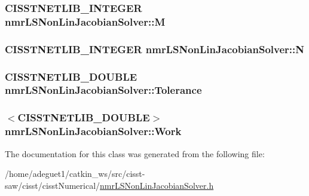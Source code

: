 \hypertarget{classnmr_l_s_non_lin_jacobian_solver_a1d5bdcef6ad8ae1f9a7819c9a0c9d2db}{
\subsubsection[{M}]{\setlength{\rightskip}{0pt plus 5cm}C\-I\-S\-S\-T\-N\-E\-T\-L\-I\-B\-\_\-\-I\-N\-T\-E\-G\-E\-R nmr\-L\-S\-Non\-Lin\-Jacobian\-Solver\-::\-M\hspace{0.3cm}{\ttfamily [protected]}}}\label{classnmr_l_s_non_lin_jacobian_solver_a1d5bdcef6ad8ae1f9a7819c9a0c9d2db}
\hypertarget{classnmr_l_s_non_lin_jacobian_solver_a50c6b56a17774e8eaaf37be19419f9b2}{
\subsubsection[{N}]{\setlength{\rightskip}{0pt plus 5cm}C\-I\-S\-S\-T\-N\-E\-T\-L\-I\-B\-\_\-\-I\-N\-T\-E\-G\-E\-R nmr\-L\-S\-Non\-Lin\-Jacobian\-Solver\-::\-N\hspace{0.3cm}{\ttfamily [protected]}}}\label{classnmr_l_s_non_lin_jacobian_solver_a50c6b56a17774e8eaaf37be19419f9b2}
\hypertarget{classnmr_l_s_non_lin_jacobian_solver_ad2dd832ff0445b614dd62570e1b3c43d}{
\subsubsection[{Tolerance}]{\setlength{\rightskip}{0pt plus 5cm}C\-I\-S\-S\-T\-N\-E\-T\-L\-I\-B\-\_\-\-D\-O\-U\-B\-L\-E nmr\-L\-S\-Non\-Lin\-Jacobian\-Solver\-::\-Tolerance\hspace{0.3cm}{\ttfamily [protected]}}}\label{classnmr_l_s_non_lin_jacobian_solver_ad2dd832ff0445b614dd62570e1b3c43d}
\hypertarget{classnmr_l_s_non_lin_jacobian_solver_ac686feb241cffda475935e624c67d1bc}{
\subsubsection[{Work}]{$<$C\-I\-S\-S\-T\-N\-E\-T\-L\-I\-B\-\_\-\-D\-O\-U\-B\-L\-E$>$ nmr\-L\-S\-Non\-Lin\-Jacobian\-Solver\-::\-Work\hspace{0.3cm}{\ttfamily [protected]}}}\label{classnmr_l_s_non_lin_jacobian_solver_ac686feb241cffda475935e624c67d1bc}


The documentation for this class was generated from the following file\-:\begin{DoxyCompactItemize}
\item 
/home/adeguet1/catkin\-\_\-ws/src/cisst-\/saw/cisst/cisst\-Numerical/\hyperlink{nmr_l_s_non_lin_jacobian_solver_8h}{nmr\-L\-S\-Non\-Lin\-Jacobian\-Solver.\-h}\end{DoxyCompactItemize}
